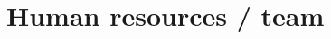 \documentclass[a4paper,11pt]{article}
\providecommand*{\note}[1]{\small \textcolor{RoyalBlue}{\begin{minipage}{\textwidth}{#1}\end{minipage}}}
\begin{document}
\pagebreak


\section{Human resources / team}
\label{sect:team}

\end{document}
